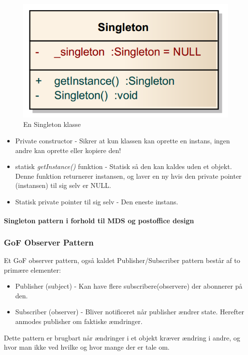 \begin{figure}[h]
	\centering
	\includegraphics[width=0.4\linewidth]{figs/spm5/singletonclassdia}
	\caption{En Singleton klasse}
	\label{fig:SingletonClass}
\end{figure}

\begin{itemize}
	\item Private constructor - Sikrer at kun klassen kan oprette en instans, ingen andre kan oprette eller kopiere den!
	\item statisk \textit{getInstance()} funktion - Statisk så den kan kaldes uden et objekt. Denne funktion returnerer instansen, og laver en ny hvis den private pointer (instansen) til sig selv er NULL.
	\item Statisk private pointer til sig selv - Den eneste instans.
\end{itemize}

\paragraph{Singleton pattern i forhold til MDS og postoffice design}

\subsubsection{GoF Observer Pattern}

Et GoF observer pattern, også kaldet Publisher/Subscriber pattern består af to primære elementer:

\begin{itemize}
	\item Publisher (subject) - Kan have flere subscribere(observere) der abonnerer på den.
	\item Subscriber (observer) - Bliver notificeret når publisher ændrer state. Herefter anmodes publisher om faktiske æmdringer.
\end{itemize}

Dette pattern er brugbart når ændringer i et objekt kræver ændring i andre, og hvor man ikke ved hvilke og hvor mange der er tale om.

